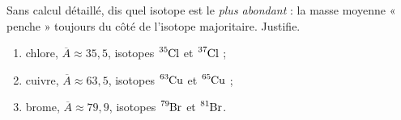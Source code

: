 \documentclass[11pt,a4paper]{article}
\begin{document}
\begin{exo}
Sans calcul détaillé, dis quel isotope est le \emph{plus abondant} : la masse moyenne « penche »
toujours du côté de l'isotope majoritaire. Justifie.
\begin{enumerate}[label=\alph*)]
  \item chlore, $\overline{A} \approx 35{,}5$, isotopes $\ce{^{35}Cl}$ et $\ce{^{37}Cl}$ ;
  \item cuivre, $\overline{A} \approx 63{,}5$, isotopes $\ce{^{63}Cu}$ et $\ce{^{65}Cu}$ ;
  \item brome, $\overline{A} \approx 79{,}9$, isotopes $\ce{^{79}Br}$ et $\ce{^{81}Br}$.
\end{enumerate}
\end{exo}
\end{document}
